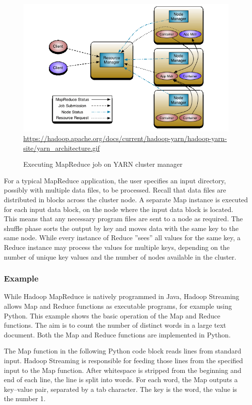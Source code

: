 \begin{figure}
\centering
\includegraphics[width=.75\textwidth]{yarn_architecture.png}\\

\scriptsize\url{https://hadoop.apache.org/docs/current/hadoop-yarn/hadoop-yarn-site/yarn_architecture.gif}\normalsize
\caption{Executing MapReduce job on YARN cluster manager}
\label{fig:yarnhadoop}
\end{figure}

For a typical MapReduce application, the user specifies an input directory, possibly with multiple data files, to be processed. Recall that data files are distributed in blocks across the cluster node. A separate Map instance is executed for each input data block, on the node where the input data block is located. This means that any necessary program files are sent to a node as required. The shuffle phase sorts the output by key and moves data with the same key to the same node. While every instance of Reduce ''sees'' all values for the same key, a Reduce instance may process the values for multiple keys, depending on the number of unique key values and the number of nodes available in the cluster. 

\subsubsection*{Example}

While Hadoop MapReduce is natively programmed in Java, Hadoop Streaming allows Map and Reduce functions as executable programs, for example using Python. This example shows the basic operation of the Map and Reduce functions. The aim is to count the number of distinct words in a large text document. Both the Map and Reduce functions are implemented in Python. 

The Map function in the following Python code block reads lines from standard input. Hadoop Streaming is responsible for feeding those lines from the specified input to the Map function. After whitespace is stripped from the beginning and end of each line, the line is split into words. For each word, the Map outputs a key--value pair, separated by a tab character. The key is the word, the value is the number 1.

